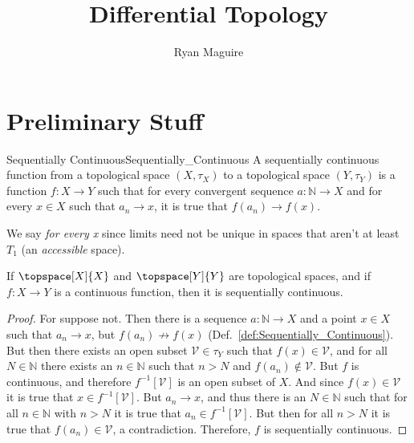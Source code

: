 \documentclass{article}                                                        %
\begin{document}
    \title{Differential Topology}
    \author{Ryan Maguire}
    \date{\vspace{-5ex}}
    \maketitle
    \tableofcontents
    \section{Preliminary Stuff}
        \begin{fdefinition}{Sequentially Continuous}{Sequentially_Continuous}
            A sequentially continuous function from a topological space
            $(X,\tau_{X})$ to a topological space $(Y,\tau_{Y})$ is a
            function $f:X\rightarrow{Y}$ such that for every convergent sequence
            $a:\mathbb{N}\rightarrow{X}$ and for every $x\in{X}$ such that
            $a_{n}\rightarrow{x}$, it is true that $f(a_{n})\rightarrow{f}(x)$.
        \end{fdefinition}
        We say \textit{for every x} since limits need not be unique in spaces
        that aren't at least $T_{1}$ (an \textit{accessible} space).
        \begin{theorem}
            \label{thm:cont_implies_seq_cont}%
            If $\topspace[X]{X}$ and $\topspace[Y]{Y}$ are topological spaces,
            and if $f:X\rightarrow{Y}$ is a continuous function, then it is
            sequentially continuous.
        \end{theorem}
        \begin{proof}
            For suppose not. Then there is a sequence
            $a:\mathbb{N}\rightarrow{X}$ and a point $x\in{X}$ such that
            $a_{n}\rightarrow{x}$, but $f(a_{n})\not\rightarrow{f}(x)$
            (Def.~\ref{def:Sequentially_Continuous}). But then there exists
            an open subset $\mathcal{V}\in\tau_{Y}$ such that
            $f(x)\in\mathcal{V}$, and for all $N\in\mathbb{N}$ there exists an
            $n\in\mathbb{N}$ such that $n>N$ and
            $f(a_{n})\notin\mathcal{V}$. But $f$ is continuous, and therefore
            $f^{\minus{1}}[\mathcal{V}]$ is an open subset of $X$. And since
            $f(x)\in\mathcal{V}$ it is true that
            $x\in{f}^{\minus{1}}[\mathcal{V}]$. But $a_{n}\rightarrow{x}$, and
            thus there is an $N\in\mathbb{N}$ such that for all
            $n\in\mathbb{N}$ with $n>N$ it is true that
            $a_{n}\in{f}^{\minus{1}}[\mathcal{V}]$. But then for all $n>N$ it is
            true that $f(a_{n})\in\mathcal{V}$, a contradiction. Therefore, $f$
            is sequentially continuous.
        \end{proof}
\end{document}
